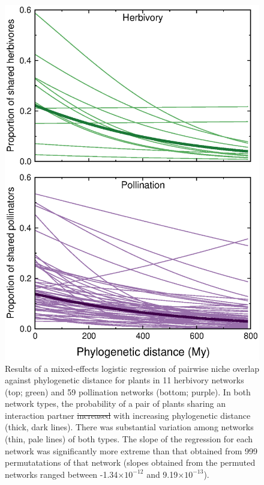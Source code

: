 \documentclass[12pt]{article}
\providecommand{\DIFadd}[1]{{\protect\color{blue}\uwave{#1}}} %
\providecommand{\DIFdel}[1]{{\protect\color{red}\sout{#1}}}                      %
\providecommand{\DIFaddFL}[1]{\DIFadd{#1}} %
\providecommand{\DIFdelFL}[1]{\DIFdel{#1}} %
\providecommand{\DIFaddbeginFL}{} %
\providecommand{\DIFaddendFL}{} %
\providecommand{\DIFdelbeginFL}{} %
\providecommand{\DIFdelendFL}{} %
\newcommand{\DIFscaledelfig}{0.5}
\newlength{\DIFdelgraphicswidth} %
\newlength{\DIFdelgraphicsheight} %
\newcommand{\DIFaddincludegraphics}[2][]{{\color{blue}\fbox{\DIFOincludegraphics[#1]{#2}}}} %
\newcommand{\DIFdelincludegraphics}[2][]{%
\sbox{\DIFdelgraphicsbox}{\DIFOincludegraphics[#1]{#2}}%
\settoboxwidth{\DIFdelgraphicswidth}{\DIFdelgraphicsbox} %
\settoboxtotalheight{\DIFdelgraphicsheight}{\DIFdelgraphicsbox} %
\scalebox{\DIFscaledelfig}{%
\parbox[b]{\DIFdelgraphicswidth}{\usebox{\DIFdelgraphicsbox}\\[-\baselineskip] \rule{\DIFdelgraphicswidth}{0em}}\llap{\resizebox{\DIFdelgraphicswidth}{\DIFdelgraphicsheight}{%
\setlength{\unitlength}{\DIFdelgraphicswidth}%
\begin{picture}(1,1)%
\thicklines\linethickness{2pt} %
{\color[rgb]{1,0,0}\put(0,0){\framebox(1,1){}}}%
{\color[rgb]{1,0,0}\put(0,0){\line( 1,1){1}}}%
{\color[rgb]{1,0,0}\put(0,1){\line(1,-1){1}}}%
\end{picture}%
}\hspace*{3pt}}} %
} %
\DeclareRobustCommand{\DIFaddbeginFL}{\DIFOaddbeginFL \let\includegraphics\DIFaddincludegraphics} %
\DeclareRobustCommand{\DIFaddendFL}{\DIFOaddendFL \let\includegraphics\DIFOincludegraphics} %
\DeclareRobustCommand{\DIFdelbeginFL}{\DIFOdelbeginFL \let\includegraphics\DIFdelincludegraphics} %
\DeclareRobustCommand{\DIFdelendFL}{\DIFOaddendFL \let\includegraphics\DIFOincludegraphics} %
\begin{document}
  \begin{figure}[!h]
    \begin{center}
      \centerline{\includegraphics*[width=.5\textwidth]{Figures/dataplots/scaled_regression_lines_full_color.eps}}
    \end{center}
     \caption{Results of a mixed-effects logistic regression of pairwise niche overlap
     against phylogenetic distance for plants in 11
     herbivory networks (top; green) and 59 pollination
     networks (bottom; purple). In both network types, the probability of a pair of plants
     sharing an interaction partner \DIFdelbeginFL \DIFdelFL{increased }\DIFdelendFL \DIFaddbeginFL \DIFaddFL{decreased }\DIFaddendFL with increasing phylogenetic distance (thick,
     dark lines). There was substantial variation among networks (thin, pale lines) of both types. The slope of the regression for each network was significantly more extreme than that obtained from 999 permutatations of that network (slopes obtained from the permuted networks ranged between -1.34$\times10^{-12}$ and 9.19$\times10^{-13}$).}
    \label{within_network_regression} 
  \end{figure}
\end{document}

